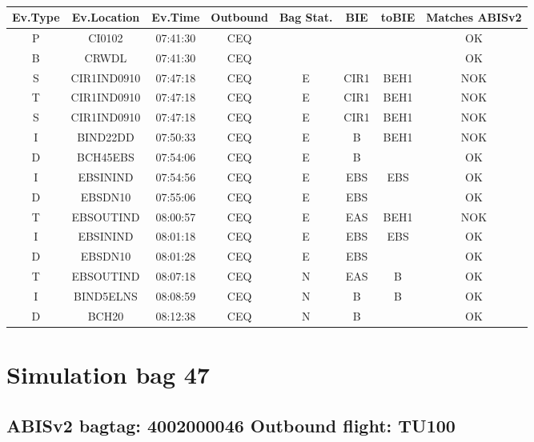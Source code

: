 \documentclass{report}
\begin{document}
\paragraph{}
\begin{longtable}{cccccccc}    \toprule
\rowcolor{white!50}
\textbf{Ev.Type} & \textbf{Ev.Location} & \textbf{Ev.Time} & \textbf{Outbound} & \textbf{Bag Stat.} & \textbf{BIE} & \textbf{toBIE} & \textbf{Matches ABISv2} \\\midrule
P & CI0102 & 07:41:30  & CEQ &  &  &  & OK\\
B & CRWDL & 07:41:30  & CEQ &  &  &  & OK\\
S & CIR1IND0910 & 07:47:18  & CEQ & E & CIR1 & BEH1 & NOK\\
T & CIR1IND0910 & 07:47:18  & CEQ & E & CIR1 & BEH1 & NOK\\
S & CIR1IND0910 & 07:47:18  & CEQ & E & CIR1 & BEH1 & NOK\\
I & BIND22DD & 07:50:33  & CEQ & E & B & BEH1 & NOK\\
D & BCH45EBS & 07:54:06  & CEQ & E & B &  & OK\\
I & EBSININD & 07:54:56  & CEQ & E & EBS & EBS & OK\\
D & EBSDN10 & 07:55:06  & CEQ & E & EBS &  & OK\\
T & EBSOUTIND & 08:00:57  & CEQ & E & EAS & BEH1 & NOK\\
I & EBSININD & 08:01:18  & CEQ & E & EBS & EBS & OK\\
D & EBSDN10 & 08:01:28  & CEQ & E & EBS &  & OK\\
T & EBSOUTIND & 08:07:18  & CEQ & N & EAS & B & OK\\
I & BIND5ELNS & 08:08:59  & CEQ & N & B & B & OK\\
D & BCH20 & 08:12:38  & CEQ & N & B &  & OK\\
\bottomrule
\end{longtable}
\pagebreak
\section*{Simulation bag 47}
\subsection*{ABISv2 bagtag: 4002000046 Outbound flight: TU100}
\end{document}
